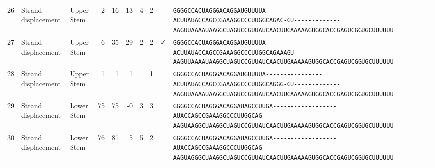 \begin{tabular}{rllrrrrrcl}
 26 & Strand displacement & Upper Stem & 2 & 16 & 13 & 4 & 2 &  &
 \color{ucsfdarkgrey}\verb|GGGGCCACUAGGGACAGGAU|\color{ucsforange}\verb|GUUUUA|\color{ucsfblue}\verb|----------------ACUU|\color{ucsfpurple}\verb|AUACCAGCCGAAAGGCCCUUGGCAG|\color{ucsfblue}\verb|AC-GU-------------AAGU|\color{ucsforange}\verb|UAAAAUAA|\color{ucsfnavy}\verb|GGCUAGUCC|\color{ucsforange}\verb|GUUAUCA|\color{ucsfteal}\verb|ACUUGAAAAAGUG|\color{ucsforange}\verb|GCACCGAGUCGGUGCUUUUUU| \\

 27 & Strand displacement & Upper Stem & 6 & 35 & 29 & 2 & 2 & ✓ &
 \color{ucsfdarkgrey}\verb|GGGGCCACUAGGGACAGGAU|\color{ucsforange}\verb|GUUUUA|\color{ucsfblue}\verb|----------------ACUU|\color{ucsfpurple}\verb|AUACCAGCCGAAAGGCCCUUGGCAG|\color{ucsfblue}\verb|AAAGU-------------AAGU|\color{ucsforange}\verb|UAAAAUAA|\color{ucsfnavy}\verb|GGCUAGUCC|\color{ucsforange}\verb|GUUAUCA|\color{ucsfteal}\verb|ACUUGAAAAAGUG|\color{ucsforange}\verb|GCACCGAGUCGGUGCUUUUUU| \\

 28 & Strand displacement & Upper Stem & 1 & 1 & 1 &  & 1 &  &
 \color{ucsfdarkgrey}\verb|GGGGCCACUAGGGACAGGAU|\color{ucsforange}\verb|GUUUUA|\color{ucsfblue}\verb|----------------ACUU|\color{ucsfpurple}\verb|AUACCAGCCGAAAGGCCCUUGGCAG|\color{ucsfblue}\verb|GG-GU-------------AAGU|\color{ucsforange}\verb|UAAAAUAA|\color{ucsfnavy}\verb|GGCUAGUCC|\color{ucsforange}\verb|GUUAUCA|\color{ucsfteal}\verb|ACUUGAAAAAGUG|\color{ucsforange}\verb|GCACCGAGUCGGUGCUUUUUU| \\

 29 & Strand displacement & Lower Stem & 75 & 75 & -0 & 3 & 3 &  &
 \color{ucsfdarkgrey}\verb|GGGGCCACUAGGGACAGGAU|\color{ucsforange}\verb|AGCCUU|\color{ucsfblue}\verb|GA------------------|\color{ucsfpurple}\verb|AUACCAGCCGAAAGGCCCUUGGCAG|\color{ucsfblue}\verb|------------------AAGU|\color{ucsforange}\verb|AAGGCUAA|\color{ucsfnavy}\verb|GGCUAGUCC|\color{ucsforange}\verb|GUUAUCA|\color{ucsfteal}\verb|ACUUGAAAAAGUG|\color{ucsforange}\verb|GCACCGAGUCGGUGCUUUUUU| \\

 30 & Strand displacement & Lower Stem & 76 & 81 & 5 & 5 & 2 &  &
 \color{ucsfdarkgrey}\verb|GGGGCCACUAGGGACAGGAU|\color{ucsforange}\verb|AGCCUU|\color{ucsfblue}\verb|GA------------------|\color{ucsfpurple}\verb|AUACCAGCCGAAAGGCCCUUGGCAG|\color{ucsfblue}\verb|------------------AAGU|\color{ucsforange}\verb|AGGGCUAA|\color{ucsfnavy}\verb|GGCUAGUCC|\color{ucsforange}\verb|GUUAUCA|\color{ucsfteal}\verb|ACUUGAAAAAGUG|\color{ucsforange}\verb|GCACCGAGUCGGUGCUUUUUU| \\


\end{tabular}
